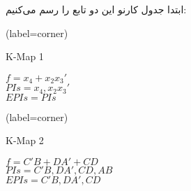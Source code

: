 ابتدا جدول کارنو این دو تابع را رسم می‌کنیم:


\begin{latin}
	\begin{minipage}{0.48\textwidth}
		\centering
		\begin{karnaugh-map}[4][4][1][$x_2$][$x_1$][$x_4$][$x_3$](label=corner)
		\end{karnaugh-map}
		\caption{K-Map 1}
		$f=x_4+x_2x_3'$\\
		$PIs=x_4, x_2x_3'$\\
		$EPIs=PIs$\\
	\end{minipage}
	\hfill
	\begin{minipage}{0.48\textwidth}
		\centering
		\begin{karnaugh-map}[4][4][1][$B$][$A$][$D$][$C$](label=corner)
		\end{karnaugh-map}
		\caption{K-Map 2}
		$f=C'B+DA'+CD$\\
		$PIs=C'B,DA',CD, AB$\\
		$EPIs=C'B,DA',CD$\\
	\end{minipage}	
\end{latin}

